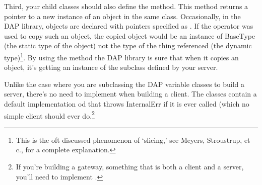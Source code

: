 \documentclass{dods-paper}
\begin{document}
Third, your child classes should also define the 
method. This method returns a pointer to a new instance of an object in the
same class. Occasionally, in the DAP library, objects are declared with
pointers specified as . If the  operator was used to
copy such an object, the copied object would be an instance of BaseType (the
static type of the object) not the type of the thing referenced (the dynamic
type)\footnote{This is the oft discussed phenomenon of `slicing,' see
Meyers\cite{meyers:ecpp}, Stroustrup\cite{stroustrup:cpp}, et c., for a
complete explanation.}. By using the  method the DAP
library is sure that when it copies an object, it's getting an instance of
the subclass defined by your server.

Unlike the case where you are subclassing the DAP variable classes to build a
server, there's no need to implement  when building a client. The
classes contain a default implementation od  that throws
InternalErr if it is ever called (which no simple client should ever
do.\footnote{If you're building a gateway, something that is both a client
  and a server, you'll need to implement .}




\end{document}
